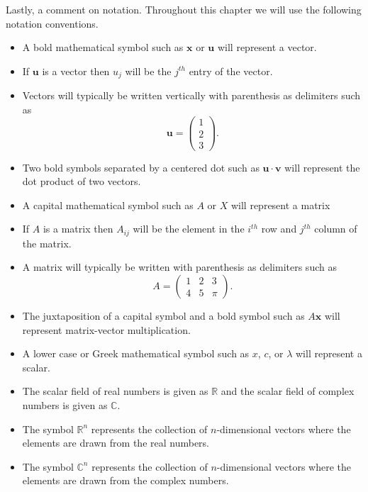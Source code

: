 \documentclass[
]{book}
\providecommand{\tightlist}{%
  \setlength{\itemsep}{0pt}\setlength{\parskip}{0pt}}
\theoremstyle{definition}
\theoremstyle{definition}
\theoremstyle{definition}
\theoremstyle{remark}
\begin{document}
Lastly, a comment on notation. Throughout this chapter we will use the following notation conventions.

\begin{itemize}
\tightlist
\item
  A bold mathematical symbol such as \(\boldsymbol{x}\) or \(\boldsymbol{u}\) will represent a vector.\\
\item
  If \(\boldsymbol{u}\) is a vector then \(u_j\) will be the \(j^{th}\) entry of the vector.
\item
  Vectors will typically be written vertically with parenthesis as delimiters such as
  \[ \boldsymbol{u} = \begin{pmatrix} 1\\2\\3 \end{pmatrix}. \]
\item
  Two bold symbols separated by a centered dot such as \(\boldsymbol{u} \cdot \boldsymbol{v}\) will represent the dot product of two vectors.
\item
  A capital mathematical symbol such as \(A\) or \(X\) will represent a matrix
\item
  If \(A\) is a matrix then \(A_{ij}\) will be the element in the \(i^{th}\) row and \(j^{th}\) column of the matrix.
\item
  A matrix will typically be written with parenthesis as delimiters such as
  \[ A = \begin{pmatrix} 1 & 2 & 3 \\ 4 & 5 & \pi \end{pmatrix}. \]
\item
  The juxtaposition of a capital symbol and a bold symbol such as \(A\boldsymbol{x}\) will represent matrix-vector multiplication.
\item
  A lower case or Greek mathematical symbol such as \(x\), \(c\), or \(\lambda\) will represent a scalar.\\
\item
  The scalar field of real numbers is given as \(\mathbb{R}\) and the scalar field of complex numbers is given as \(\mathbb{C}\).\\
\item
  The symbol \(\mathbb{R}^n\) represents the collection of \(n\)-dimensional vectors where the elements are drawn from the real numbers.\\
\item
  The symbol \(\mathbb{C}^n\) represents the collection of \(n\)-dimensional vectors where the elements are drawn from the complex numbers.
\end{itemize}
\end{document}
